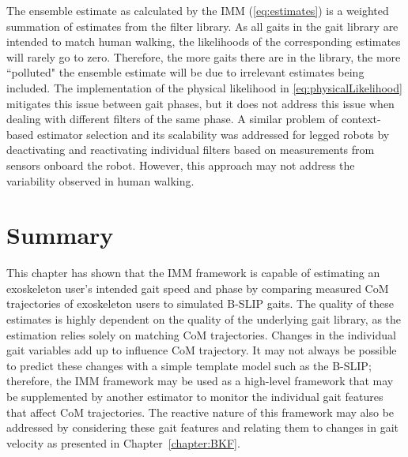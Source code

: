 The ensemble estimate as calculated by the IMM (\ref{eq:estimates}) is a weighted summation of estimates from the filter library. As all gaits in the gait library are intended to match human walking, the likelihoods of the corresponding estimates will rarely go to zero. Therefore, the more gaits there are in the library, the more ``polluted" the ensemble estimate will be due to irrelevant estimates being included. The implementation of the physical likelihood in \eqref{eq:physicalLikelihood} mitigates this issue between gait phases, but it does not address this issue when dealing with different filters of the same phase. A similar problem of context-based estimator selection and its scalability was addressed for legged robots by deactivating and reactivating individual filters \cite{skaff2010context} based on measurements from sensors onboard the robot. However, this approach may not address the variability observed in human walking.

\section{Summary}\label{sec:IMM_summary}
This chapter has shown that the IMM framework is capable of estimating an exoskeleton user's intended gait speed and phase by comparing measured CoM trajectories of exoskeleton users to simulated B-SLIP gaits. The  quality of these estimates is highly dependent on the quality of the underlying gait library, as the estimation relies solely on matching CoM trajectories. Changes in the individual gait variables add up to influence CoM trajectory. It may not always be possible to predict these changes with a simple template model such as the B-SLIP; therefore, the IMM framework may be used as a high-level framework that may be supplemented by another estimator to monitor the individual gait features that affect CoM trajectories. The reactive nature of this framework may also be addressed by considering these gait features and relating them to changes in gait velocity as presented in Chapter~\ref{chapter:BKF}.